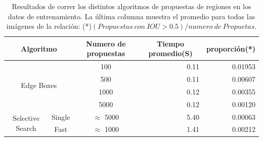 \begin{table}[H]
	\centering
	\resizebox{\textwidth}{!} {
		\begin{tabular}{|c|c|c|r|r|}
			\hline
			\multicolumn{2}{|c|}{Algoritmo}                   & Numero de propuestas & \multicolumn{1}{c|}{Tiempo promedio(S)} & \multicolumn{1}{c|}{proporción(*)} \\ \hline
			\multicolumn{2}{|c|}{\multirow{4}{*}{Edge Boxes}} & 100                  & 0.11                                    & 0.01953                                                \\ \cline{3-5} 
			\multicolumn{2}{|c|}{}                            & 500                  & 0.11                                    & 0.00607                                                \\ \cline{3-5} 
			\multicolumn{2}{|c|}{}                            & 1000                 & 0.12                                    & 0.00355                                                \\ \cline{3-5} 
			\multicolumn{2}{|c|}{}                            & 5000                 & 0.12                                    & 0.00120                                                \\ \hline
			\multirow{2}{*}{Selective Search}     & Single    & $\approx$ 5000       & 5.40                                    & 0.00063                                                \\ \cline{2-5} 
			& Fast      & $\approx$ 1000       & 1.41                                    & 0.00212                                                \\ \hline
		\end{tabular}
	}                                                 
	\caption{Resultados de correr los distintos algoritmos de propuestas de regiones en los datos de entrenamiento. La última columna muestra el promedio para todas las imágenes de la relación: (*)$(Propuestas\ con\ IOU > 0.5) / numero\ de\ Propuetas$.}
	\label{tabla:edgeVSselct}
\end{table}


